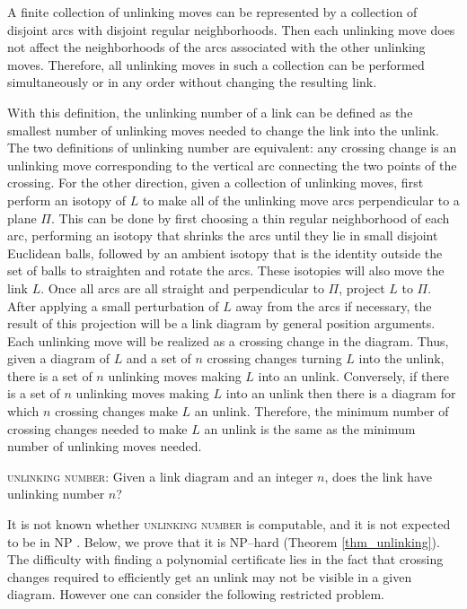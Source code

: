 \documentclass[12pt]{amsart}
\theoremstyle{definition}
\theoremstyle{remark}
\begin{document}
A finite collection of unlinking moves can be represented by a collection of disjoint arcs with disjoint regular neighborhoods.
Then each unlinking move does not affect the neighborhoods of the arcs associated with the other unlinking moves.
Therefore, all unlinking moves in such a collection can be performed simultaneously or in any order without changing the resulting link.


With this definition, the unlinking number of a link can be defined as the smallest number of unlinking moves needed to change the link into the unlink.
The two definitions of unlinking number are equivalent:  any crossing change is an unlinking move corresponding to the vertical arc connecting the two points of the crossing.
For the other direction, given a collection of unlinking moves, first perform an isotopy of $L$ to make all of the unlinking move arcs perpendicular to a plane $\Pi$.
This can be done by first choosing a thin regular neighborhood of each arc, performing an isotopy that shrinks the arcs until they lie in small disjoint Euclidean balls, followed by an ambient isotopy that is the identity outside the set of balls to straighten and rotate the arcs.
These isotopies will also move the link $L$.
Once all arcs are all straight and perpendicular to $\Pi$, project $L$ to $\Pi$.
After applying a small perturbation of $L$ away from the arcs if necessary, the result of this projection will be a link diagram by general position arguments.
Each unlinking move will be realized as a crossing change in the diagram.
Thus, given a diagram of $L$ and a set of $n$ crossing changes turning $L$ into the unlink, there is a set of $n$ unlinking moves making $L$ into an unlink.
Conversely, if there is a set of $n$ unlinking moves making $L$ into an unlink then there is a diagram for which $n$ crossing changes make $L$ an unlink.
Therefore, the minimum number of crossing changes needed to make $L$ an unlink is the same as the minimum number of unlinking moves needed.


\vspace{0.14in}
\textsc{unlinking number}: Given a link diagram and an integer $n$, does the link  have unlinking number $n$?
\vspace{0.14in}


It is not known whether \textsc{unlinking number} is computable, and it is not expected to be in NP \cite{Lackenby3}.
Below, we prove that it is NP--hard (Theorem \ref{thm_unlinking}).
The difficulty with finding a polynomial certificate lies in the fact that crossing changes required to efficiently get an unlink may not be visible in a given diagram.
However one can consider the following restricted problem.
\end{document}
